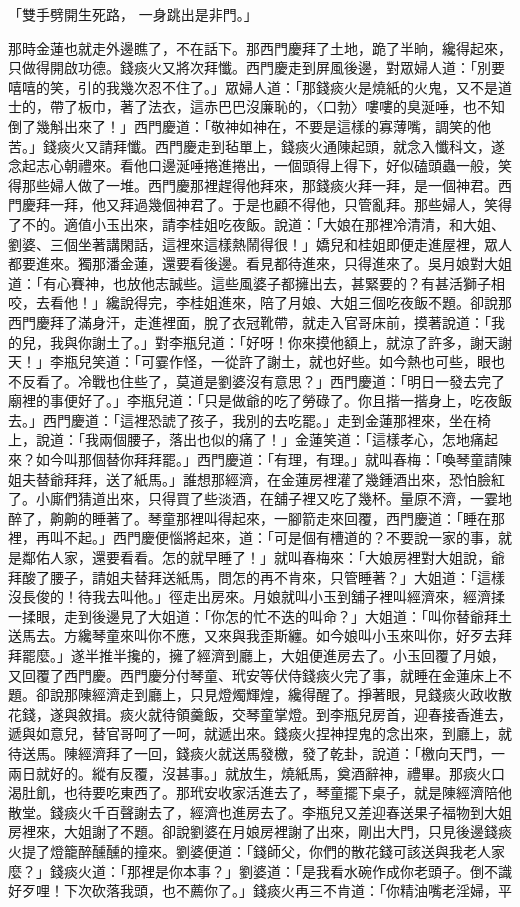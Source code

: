 「雙手劈開生死路，  一身跳出是非門。」

那時金蓮也就走外邊瞧了，不在話下。那西門慶拜了土地，跪了半晌，纔得起來，只做得開啟功德。錢痰火又將次拜懺。西門慶走到屏風後邊，對眾婦人道：「別要嘻嘻的笑，引的我幾次忍不住了。」眾婦人道：「那錢痰火是燒紙的火鬼，又不是道士的，帶了板巾，著了法衣，這赤巴巴沒廉恥的，〈口勃〉嘍嘍的臭涎唾，也不知倒了幾斛出來了！」西門慶道：「敬神如神在，不要是這樣的寡薄嘴，調笑的他苦。」錢痰火又請拜懺。西門慶走到毡單上，錢痰火通陳起頭，就念入懺科文，遂念起志心朝禮來。看他口邊涎唾捲進捲出，一個頭得上得下，好似磕頭蟲一般，笑得那些婦人做了一堆。西門慶那裡趕得他拜來，那錢痰火拜一拜，是一個神君。西門慶拜一拜，他又拜過幾個神君了。于是也顧不得他，只管亂拜。那些婦人，笑得了不的。適值小玉出來，請李桂姐吃夜飯。說道：「大娘在那裡冷清清，和大姐、劉婆、三個坐著講閑話，這裡來這樣熱鬧得很！」嬌兒和桂姐即便走進屋裡，眾人都要進來。獨那潘金蓮，還要看後邊。看見都待進來，只得進來了。吳月娘對大姐道：「有心賽神，也放他志誠些。這些風婆子都擁出去，甚緊要的？有甚活獅子相咬，去看他！」纔說得完，李桂姐進來，陪了月娘、大姐三個吃夜飯不題。卻說那西門慶拜了滿身汗，走進裡面，脫了衣冠靴帶，就走入官哥床前，摸著說道：「我的兒，我與你謝土了。」對李瓶兒道：「好呀！你來摸他額上，就涼了許多，謝天謝天！」李瓶兒笑道：「可霎作怪，一從許了謝土，就也好些。如今熱也可些，眼也不反看了。冷戰也住些了，莫道是劉婆沒有意思？」西門慶道：「明日一發去完了廟裡的事便好了。」李瓶兒道：「只是做爺的吃了勞碌了。你且揩一揩身上，吃夜飯去。」西門慶道：「這裡恐諕了孩子，我別的去吃罷。」走到金蓮那裡來，坐在椅上，說道：「我兩個腰子，落出也似的痛了！」金蓮笑道：「這樣孝心，怎地痛起來？如今叫那個替你拜拜罷。」西門慶道：「有理，有理。」就叫春梅：「喚琴童請陳姐夫替爺拜拜，送了紙馬。」誰想那經濟，在金蓮房裡灌了幾鍾酒出來，恐怕臉紅了。小廝們猜道出來，只得買了些淡酒，在舖子裡又吃了幾杯。量原不濟，一霎地醉了，齁齁的睡著了。琴童那裡叫得起來，一腳箭走來回覆，西門慶道：「睡在那裡，再叫不起。」西門慶便惱將起來，道：「可是個有槽道的？不要說一家的事，就是鄰佑人家，還要看看。怎的就早睡了！」就叫春梅來：「大娘房裡對大姐說，爺拜酸了腰子，請姐夫替拜送紙馬，問怎的再不肯來，只管睡著？」大姐道：「這樣沒長俊的！待我去叫他。」徑走出房來。月娘就叫小玉到舖子裡叫經濟來，經濟揉一揉眼，走到後邊見了大姐道：「你怎的忙不迭的叫命？」大姐道：「叫你替爺拜土送馬去。方纔琴童來叫你不應，又來與我歪斯纏。如今娘叫小玉來叫你，好歹去拜拜罷麼。」遂半推半攙的，擁了經濟到廳上，大姐便進房去了。小玉回覆了月娘，又回覆了西門慶。西門慶分付琴童、玳安等伏侍錢痰火完了事，就睡在金蓮床上不題。卻說那陳經濟走到廳上，只見燈燭輝煌，纔得醒了。掙著眼，見錢痰火政收散花錢，遂與敘揖。痰火就待領羹飯，交琴童掌燈。到李瓶兒房首，迎春接香進去，遞與如意兒，替官哥呵了一呵，就遞出來。錢痰火捏神捏鬼的念出來，到廳上，就待送馬。陳經濟拜了一回，錢痰火就送馬發檄，發了乾卦，說道：「檄向天門，一兩日就好的。縱有反覆，沒甚事。」就放生，燒紙馬，奠酒辭神，禮畢。那痰火口渴肚飢，也待要吃東西了。那玳安收家活進去了，琴童擺下桌子，就是陳經濟陪他散堂。錢痰火千百聲謝去了，經濟也進房去了。李瓶兒又差迎春送果子福物到大姐房裡來，大姐謝了不題。卻說劉婆在月娘房裡謝了出來，剛出大門，只見後邊錢痰火提了燈籠醉醺醺的撞來。劉婆便道：「錢師父，你們的散花錢可該送與我老人家麼？」錢痰火道：「那裡是你本事？」劉婆道：「是我看水碗作成你老頭子。倒不識好歹哩！下次砍落我頭，也不薦你了。」錢痰火再三不肯道：「你精油嘴老淫婦，平